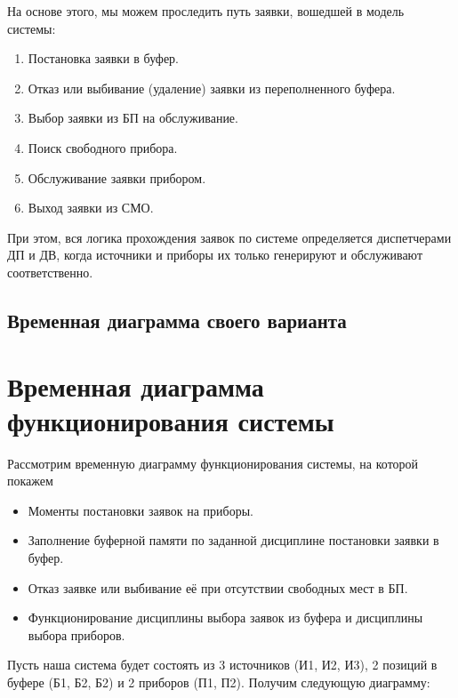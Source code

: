 \documentclass{article}
\begin{document}
	На основе этого, мы можем проследить путь заявки, вошедшей в модель системы:
	\begin{enumerate}
		\item Постановка заявки в буфер.
		\item Отказ или выбивание (удаление) заявки из переполненного буфера.
		\item Выбор заявки из БП на обслуживание.
		\item Поиск свободного прибора.
		\item Обслуживание заявки прибором.
		\item Выход заявки из СМО.
	\end{enumerate}
	При этом, вся логика прохождения заявок по системе определяется диспетчерами ДП и ДВ, когда источники и приборы их только генерируют и обслуживают соответственно.


	\subsection{Временная диаграмма своего варианта}
	\section{Временная диаграмма функционирования системы}
	Рассмотрим временную диаграмму функционирования системы, на которой покажем
	\begin{itemize}
		\item Моменты постановки заявок на приборы.
		\item Заполнение буферной памяти по заданной дисциплине постановки заявки в буфер.
		\item Отказ заявке или выбивание её при отсутствии свободных мест в БП.
		\item Функционирование дисциплины выбора заявок из буфера и дисциплины выбора приборов.
	\end{itemize}
	Пусть наша система будет состоять из 3 источников (И1, И2, И3), 2 позиций в буфере (Б1, Б2, Б2) и 2 приборов (П1, П2). Получим следующую диаграмму:
\end{document}
